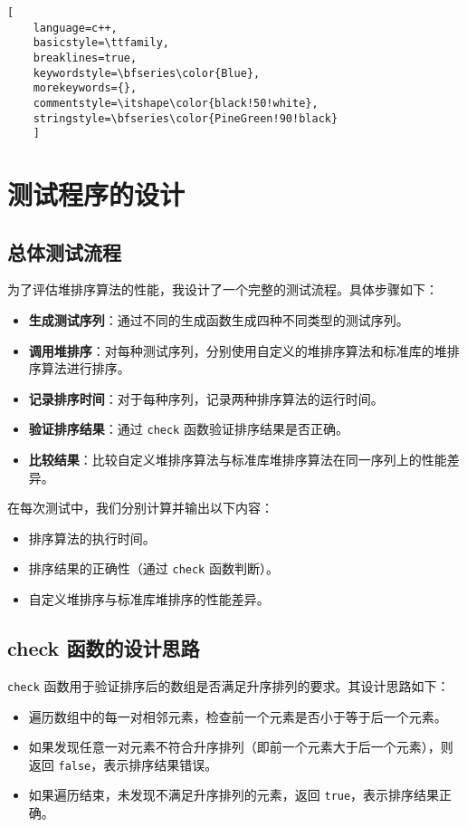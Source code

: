 \documentclass[UTF8]{ctexart}
\begin{document}
\begin{lstlisting}[ 
    language=c++,
    basicstyle=\ttfamily,
    breaklines=true,
    keywordstyle=\bfseries\color{Blue}, 
    morekeywords={}, 
    commentstyle=\itshape\color{black!50!white},
    stringstyle=\bfseries\color{PineGreen!90!black} 
    ]

\end{lstlisting}

\section{测试程序的设计}

\subsection{总体测试流程}
为了评估堆排序算法的性能，我设计了一个完整的测试流程。具体步骤如下：

\begin{itemize}
    \item \textbf{生成测试序列}：通过不同的生成函数生成四种不同类型的测试序列。
    \item \textbf{调用堆排序}：对每种测试序列，分别使用自定义的堆排序算法和标准库的堆排序算法进行排序。
    \item \textbf{记录排序时间}：对于每种序列，记录两种排序算法的运行时间。
    \item \textbf{验证排序结果}：通过 \texttt{check} 函数验证排序结果是否正确。
    \item \textbf{比较结果}：比较自定义堆排序算法与标准库堆排序算法在同一序列上的性能差异。
\end{itemize}

在每次测试中，我们分别计算并输出以下内容：
\begin{itemize}
    \item 排序算法的执行时间。
    \item 排序结果的正确性（通过 \texttt{check} 函数判断）。
    \item 自定义堆排序与标准库堆排序的性能差异。
\end{itemize}

\subsection{check 函数的设计思路}
\texttt{check} 函数用于验证排序后的数组是否满足升序排列的要求。其设计思路如下：

\begin{itemize}
    \item 遍历数组中的每一对相邻元素，检查前一个元素是否小于等于后一个元素。
    \item 如果发现任意一对元素不符合升序排列（即前一个元素大于后一个元素），则返回 \texttt{false}，表示排序结果错误。
    \item 如果遍历结束，未发现不满足升序排列的元素，返回 \texttt{true}，表示排序结果正确。
\end{itemize}
\end{document}
